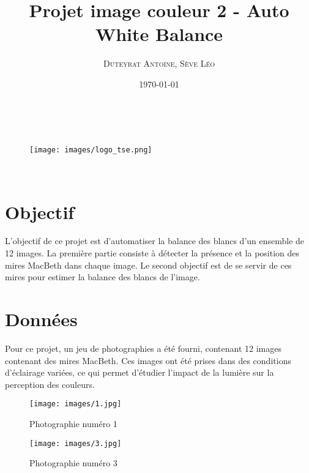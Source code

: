 \documentclass[12pt]{article}
\title{\textbf{Projet image couleur 2 - Auto White Balance}}
\author{
    \textsc{Duteyrat Antoine},
    \textsc{Sève Léo}
}
\date{\today}
\makeatletter
\let\titre\@title %
\let\auteurs\@author %
\let\date\@date %
\makeatother
\begin{document}
\begin{titlepage}
    \begin{center}
        \vskip 1.5cm
        {\color {couleur}{\huge \bf \titre}}\\[5mm] %
        \vskip 0.5cm
        \begin{figure}[h]
        \centering
        \texttt{[image: images/logo\_tse.png]}
        \end{figure}
        \vskip 1cm %
        {\large \auteurs}\\ %
        \vskip 0.5cm %
        \vfill
        \vskip 0.2cm
        \date %
      \end{center}
\end{titlepage}
\clearpage

\tableofcontents

\newpage

\section{Objectif}

L'objectif de ce projet est d'automatiser la balance des blancs d'un ensemble de 12 images.
La première partie consiste à détecter la présence et la position des mires MacBeth dans chaque image.
Le second objectif est de se servir de ces mires pour estimer la balance des blancs de l'image.

\section{Données}

Pour ce projet, un jeu de photographies a été fourni, contenant 12 images contenant des mires MacBeth. Ces images ont été prises dans des conditions d'éclairage variées, ce qui permet d'étudier l'impact de la lumière sur la perception des couleurs.

\begin{figure}[H]
    \centering
    \begin{minipage}{0.48\textwidth}
        \centering
        \texttt{[image: images/1.jpg]}
        \caption{Photographie numéro 1}
    \end{minipage}
    \hfill
    \begin{minipage}{0.48\textwidth}
        \centering
        \texttt{[image: images/3.jpg]}
        \caption{Photographie numéro 3}
    \end{minipage}
\end{figure}
\end{document}
